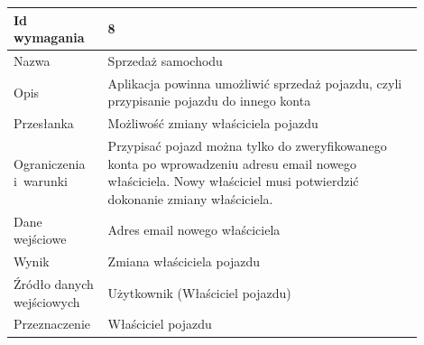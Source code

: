 \documentclass[12pt]{article}
\begin{document}
\begin{table}[H]
\begin{center}
	\begin{tabular}{|p{0.18\linewidth}|p{0.72\linewidth}|}%
	\hline
	Id wymagania 	& 8 				\\ \hline
	Nazwa			& Sprzedaż samochodu
 \\ \hline
	Opis &
	
Aplikacja powinna umożliwić sprzedaż pojazdu, czyli przypisanie pojazdu do innego konta

\\ \hline
	Przesłanka & 

Możliwość zmiany właściciela pojazdu

  \\ \hline
	Ograniczenia i~warunki & 

Przypisać pojazd można tylko do zweryfikowanego konta po wprowadzeniu adresu email nowego właściciela. Nowy właściciel musi potwierdzić dokonanie zmiany właściciela.

 \\ \hline
	Dane wejściowe &

Adres email nowego właściciela


 \\ \hline
	Wynik & 

Zmiana właściciela pojazdu


\\ \hline
	Źródło danych wejściowych &

Użytkownik (Właściciel pojazdu)


\\ \hline

	Przeznaczenie & 
	
Właściciel pojazdu

\\ \hline
	\end{tabular}
\end{center}
\end{table}
\end{document}
